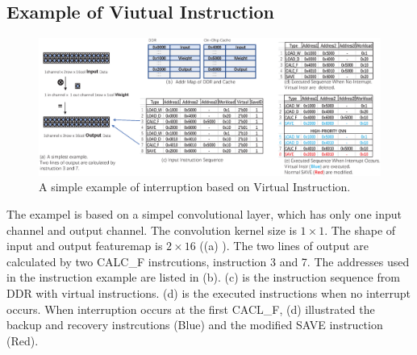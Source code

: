\subsection{Example of Viutual Instruction}

\begin{figure}[t]
	\centering
	\includegraphics[width=0.95\linewidth]{fig/interexample.eps}
	\caption{ A simple example of interruption based on Virtual Instruction. }
	\label{fig:interexample}
\end{figure}

The exampel is based on a simpel convolutional layer, which has only one input channel and output channel. The convolution kernel size is $1 \times 1$. The shape of input and output featuremap is $ 2 \times 16 $ ((a) ). The two lines of output are calculated by two CALC\_F instrcutions, instruction 3 and 7. The addresses used in the instruction example are listed in (b). (c) is the instruction sequence from DDR with virtual instructions. (d) is the executed instructions when no interrupt occurs. When interruption occurs at the first CACL\_F, (d) illustrated the backup and recovery instrcutions (Blue) and the modified SAVE instruction (Red).

